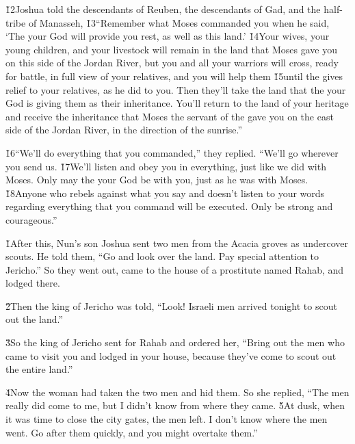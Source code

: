 \v{12}Joshua told the descendants of Reuben, the descendants of Gad, and the half-tribe of Manasseh, \v{13}``Remember what Moses commanded you when he said, `The  your God will provide you rest, as well as this land.' \v{14}Your wives, your young children, and your livestock will remain in the land that Moses gave you on this side of the Jordan River, but you and all your warriors will cross, ready for battle, in full view of your relatives, and you will help them \v{15}until the  gives relief to your relatives, as he did to you. Then they'll take the land that the  your God is giving them as their inheritance. You'll return to the land of your heritage and receive the inheritance that Moses the servant of the  gave you on the east side of the Jordan River, in the direction of the sunrise.''

\v{16}``We'll do everything that you commanded,'' they replied. ``We'll go wherever you send us. \v{17}We'll listen and obey you in everything, just like we did with Moses. Only may the  your God be with you, just as he was with Moses. \v{18}Anyone who rebels against what you say and doesn't listen to your words regarding everything that you command will be executed. Only be strong and courageous.''

\v{1}After this, Nun's son Joshua sent two men from the Acacia groves as undercover scouts. He told them, ``Go and look over the land. Pay special attention to Jericho.'' So they went out, came to the house of a prostitute named Rahab, and lodged there.

\v{2}Then the king of Jericho was told, ``Look! Israeli men arrived tonight to scout out the land.''

\v{3}So the king of Jericho sent for Rahab and ordered her, ``Bring out the men who came to visit you and lodged in your house, because they've come to scout out the entire land.''

\v{4}Now the woman had taken the two men and hid them. So she replied, ``The men really did come to me, but I didn't know from where they came. \v{5}At dusk, when it was time to close the city gates, the men left. I don't know where the men went. Go after them quickly, and you might overtake them.''

